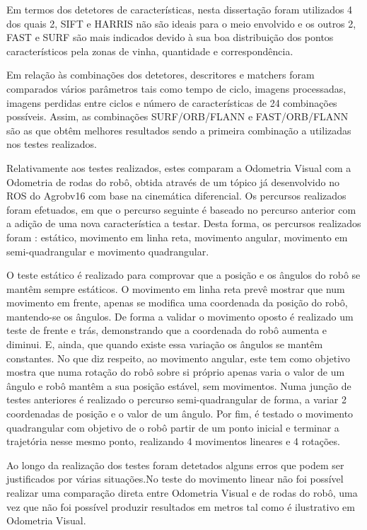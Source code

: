 Em termos dos detetores de características, nesta dissertação foram utilizados 4 dos quais 2, SIFT e HARRIS não são ideais para o meio envolvido e os outros 2, FAST e SURF são mais indicados devido à sua boa distribuição dos pontos característicos pela zonas de vinha, quantidade e correspondência.

Em relação às combinações dos detetores, descritores e matchers foram comparados vários parâmetros tais como tempo de ciclo, imagens processadas, imagens perdidas entre ciclos e número de características de 24 combinações possíveis. Assim, as combinações SURF/ORB/FLANN e FAST/ORB/FLANN são as que obtêm melhores resultados sendo a primeira combinação a utilizadas nos testes realizados.

Relativamente aos testes realizados, estes comparam a Odometria Visual com a Odometria de rodas do robô, obtida através de um tópico já desenvolvido no ROS do Agrobv16 com base na cinemática diferencial. Os percursos realizados foram efetuados, em que o percurso seguinte é baseado no percurso anterior com a adição de uma nova característica a testar. Desta forma, os percursos realizados foram : estático, movimento em linha reta, movimento angular, movimento em semi-quadrangular e movimento quadrangular.


O teste estático é realizado para comprovar que a posição e os ângulos do robô se mantêm sempre estáticos. O movimento em linha reta prevê mostrar que num movimento em frente, apenas se modifica uma coordenada da posição do robô, mantendo-se os ângulos. De forma a validar o movimento oposto é realizado um teste de frente e trás, demonstrando que a coordenada do robô aumenta e diminui. E, ainda,  que quando existe essa variação os ângulos se mantêm constantes. No que diz respeito, ao movimento angular, este tem como objetivo mostra que numa rotação do robô sobre si próprio apenas varia o valor de um ângulo e robô mantêm a sua posição estável, sem movimentos. Numa junção de testes anteriores é realizado o percurso semi-quadrangular de forma, a variar 2 coordenadas de posição e o valor de um ângulo. Por fim, é testado o movimento quadrangular com objetivo de o robô partir de um ponto inicial e terminar a trajetória nesse mesmo ponto, realizando 4 movimentos lineares e 4 rotações.

 
Ao longo da realização dos testes foram detetados alguns erros que podem ser justificados por várias situações.No teste do movimento linear não foi possível realizar uma comparação direta entre Odometria Visual e de rodas do robô, uma vez que não foi possível produzir resultados em metros tal como é ilustrativo em Odometria Visual.



